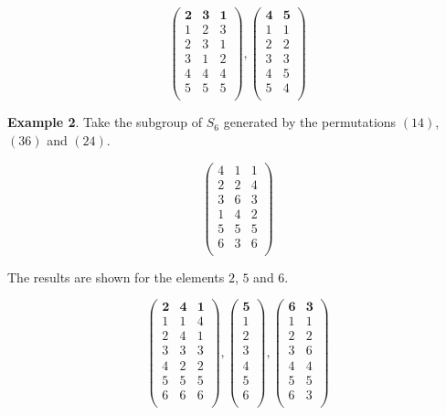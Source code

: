 \documentclass[12pt]{extarticle}
\begin{document}
$$\begin{pmatrix} 
  \textbf{2} &  \textbf{3} &  \textbf{1} \\ 
  1 &  2 &  3 \\ 
  2 &  3 &  1 \\ 
  3 &  1 &  2 \\ 
  4 &  4 &  4 \\ 
  5 &  5 &  5 \\ 
\end{pmatrix} 
,
\begin{pmatrix} 
  \textbf{4} &  \textbf{5} \\ 
  1 &  1 \\ 
  2 &  2 \\ 
  3 &  3 \\ 
  4 &  5 \\ 
  5 &  4 \\ 
\end{pmatrix} $$

\textbf{Example 2}. Take the subgroup of $S_6$ generated by the permutations $(14)$, $(36)$ and $(24)$.

$$\begin{pmatrix} 
  4 &  1 &  1 \\ 
  2 &  2 &  4 \\ 
  3 &  6 &  3 \\ 
  1 &  4 &  2 \\ 
  5 &  5 &  5 \\ 
  6 &  3 &  6 \\ 
\end{pmatrix} $$

The results are shown for the elements $2$, $5$ and $6$.

$$\begin{pmatrix} 
  \textbf{2} &  \textbf{4} &  \textbf{1} \\ 
  1 &  1 &  4 \\ 
  2 &  4 &  1 \\ 
  3 &  3 &  3 \\ 
  4 &  2 &  2 \\ 
  5 &  5 &  5 \\ 
  6 &  6 &  6 \\ 
\end{pmatrix} 
,
\begin{pmatrix} 
  \textbf{5} \\ 
  1 \\ 
  2 \\ 
  3 \\ 
  4 \\ 
  5 \\ 
  6 \\ 
\end{pmatrix}
,
\begin{pmatrix} 
  \textbf{6} &  \textbf{3} \\ 
  1 &  1 \\ 
  2 &  2 \\ 
  3 &  6 \\ 
  4 &  4 \\ 
  5 &  5 \\ 
  6 &  3 \\ 
\end{pmatrix} $$
\end{document}
